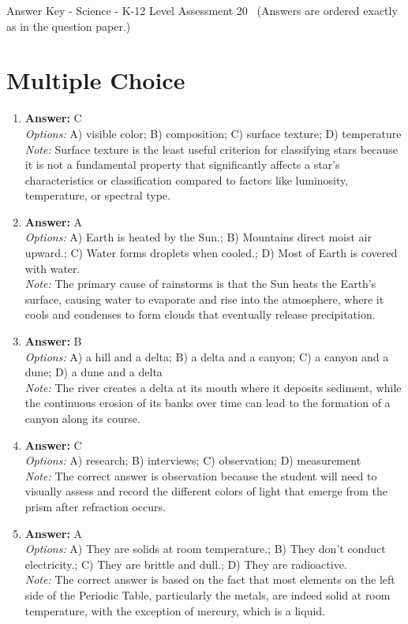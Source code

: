 \documentclass[12pt]{article}
\begin{document}
\begin{center}
Answer Key - Science - K-12 Level Assessment 20 \
\small (Answers are ordered exactly as in the question paper.)
\end{center}

\section*{Multiple Choice}
\begin{enumerate}[label=\arabic*.]
\item \textbf{Answer:} C
\\ \textit{Options:} A) visible color; B) composition; C) surface texture; D) temperature
\\ \textit{Note:} Surface texture is the least useful criterion for classifying stars because it is not a fundamental property that significantly affects a star's characteristics or classification compared to factors like luminosity, temperature, or spectral type.
\item \textbf{Answer:} A
\\ \textit{Options:} A) Earth is heated by the Sun.; B) Mountains direct moist air upward.; C) Water forms droplets when cooled.; D) Most of Earth is covered with water.
\\ \textit{Note:} The primary cause of rainstorms is that the Sun heats the Earth's surface, causing water to evaporate and rise into the atmosphere, where it cools and condenses to form clouds that eventually release precipitation.
\item \textbf{Answer:} B
\\ \textit{Options:} A) a hill and a delta; B) a delta and a canyon; C) a canyon and a dune; D) a dune and a delta
\\ \textit{Note:} The river creates a delta at its mouth where it deposits sediment, while the continuous erosion of its banks over time can lead to the formation of a canyon along its course.
\item \textbf{Answer:} C
\\ \textit{Options:} A) research; B) interviews; C) observation; D) measurement
\\ \textit{Note:} The correct answer is observation because the student will need to visually assess and record the different colors of light that emerge from the prism after refraction occurs.
\item \textbf{Answer:} A
\\ \textit{Options:} A) They are solids at room temperature.; B) They don't conduct electricity.; C) They are brittle and dull.; D) They are radioactive.
\\ \textit{Note:} The correct answer is based on the fact that most elements on the left side of the Periodic Table, particularly the metals, are indeed solid at room temperature, with the exception of mercury, which is a liquid.
\end{enumerate}
\end{document}

